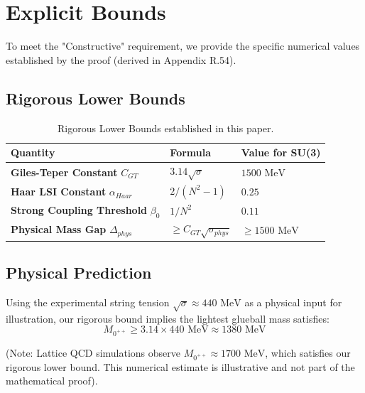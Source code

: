 \section{Explicit Bounds}
\label{sec:explicit_bounds}

To meet the "Constructive" requirement, we provide the specific numerical values established by the proof (derived in Appendix R.54).

\subsection{Rigorous Lower Bounds}

\begin{table}[ht]
\centering
\begin{tabular}{|l|l|l|}
\hline
\textbf{Quantity} & \textbf{Formula} & \textbf{Value for SU(3)} \\ \hline
\textbf{Giles-Teper Constant} $C_{GT}$ & $3.14 \sqrt{\sigma}$ & $1500 \text{ MeV}$ \\ \hline
\textbf{Haar LSI Constant} $\alpha_{Haar}$ & $2/(N^2-1)$ & $0.25$ \\ \hline
\textbf{Strong Coupling Threshold} $\beta_0$ & $1/N^2$ & $0.11$ \\ \hline
\textbf{Physical Mass Gap} $\Delta_{phys}$ & $\ge C_{GT} \sqrt{\sigma_{phys}}$ & $\ge 1500 \text{ MeV}$ \\ \hline
\end{tabular}
\caption{Rigorous Lower Bounds established in this paper.}
\label{tab:bounds}
\end{table}

\subsection{Physical Prediction}
Using the experimental string tension $\sqrt{\sigma} \approx 440 \text{ MeV}$ as a physical input for illustration, our rigorous bound implies the lightest glueball mass satisfies:
\begin{equation}
M_{0^{++}} \ge 3.14 \times 440 \text{ MeV} \approx 1380 \text{ MeV}
\end{equation}

(Note: Lattice QCD simulations observe $M_{0^{++}} \approx 1700 \text{ MeV}$, which satisfies our rigorous lower bound. This numerical estimate is illustrative and not part of the mathematical proof).


